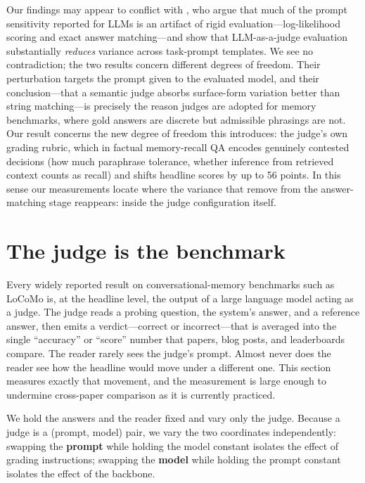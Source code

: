 \documentclass[11pt]{article}
\begin{document}
Our findings may appear to conflict with \citet{hua2025flaw}, who argue that much of the prompt sensitivity reported for LLMs is an artifact of rigid evaluation---log-likelihood scoring and exact answer matching---and show that LLM-as-a-judge evaluation substantially \emph{reduces} variance across task-prompt templates. We see no contradiction; the two results concern different degrees of freedom. Their perturbation targets the prompt given to the evaluated model, and their conclusion---that a semantic judge absorbs surface-form variation better than string matching---is precisely the reason judges are adopted for memory benchmarks, where gold answers are discrete but admissible phrasings are not. Our result concerns the new degree of freedom this introduces: the judge's own grading rubric, which in factual memory-recall QA encodes genuinely contested decisions (how much paraphrase tolerance, whether inference from retrieved context counts as recall) and shifts headline scores by up to 56 points. In this sense our measurements locate where the variance that \citet{hua2025flaw} remove from the answer-matching stage reappears: inside the judge configuration itself.

\section{The judge is the benchmark}\label{sec:judge}

Every widely reported result on conversational-memory benchmarks such as LoCoMo is, at the headline level, the output of a large language model acting as a judge. The judge reads a probing question, the system's answer, and a reference answer, then emits a verdict---correct or incorrect---that is averaged into the single ``accuracy'' or ``score'' number that papers, blog posts, and leaderboards compare. The reader rarely sees the judge's prompt. Almost never does the reader see how the headline would move under a different one. This section measures exactly that movement, and the measurement is large enough to undermine cross-paper comparison as it is currently practiced.

We hold the answers and the reader fixed and vary only the judge. Because a judge is a (prompt, model) pair, we vary the two coordinates independently: swapping the \textbf{prompt} while holding the model constant isolates the effect of grading instructions; swapping the \textbf{model} while holding the prompt constant isolates the effect of the backbone.
\end{document}
